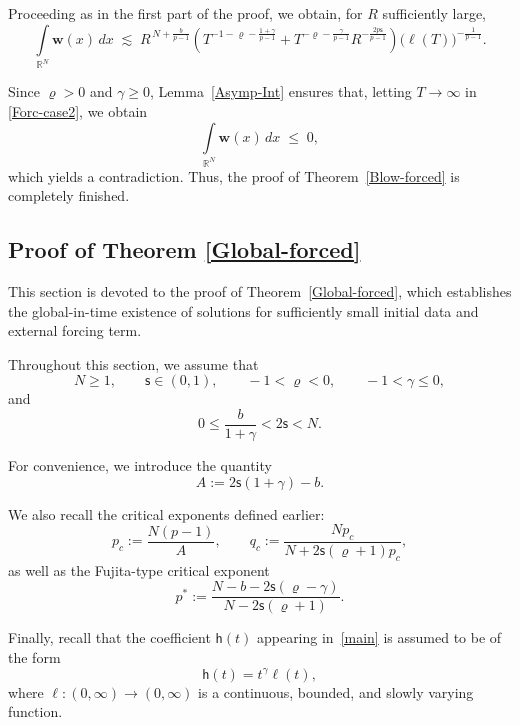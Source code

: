 \documentclass[12pt,reqno]{amsart}
\theoremstyle{plain}
\theoremstyle{definition}
\theoremstyle{remark}
\numberwithin{equation}{section}
\newcommand{\R}{\mathbb R}
\newcommand{\h}{\mathsf h}
\newcommand{\bw}{\mathbf{w}}
\newcommand{\ts}{\mathsf{s}}
\begin{document}
\begin{enumerate}[label=(\roman*)]
Proceeding as in the first part of the proof, we obtain, for $R$ sufficiently large,  
\begin{equation}
    \label{Forc-case2}
    \int\limits_{\R^N} \bw(x) \, dx
    \;\lesssim\;
    R^{\,N+\frac{b}{p-1}}
    \left(
        T^{-1-\varrho-\frac{1+\gamma}{p-1}}
        + T^{-\varrho-\frac{\gamma}{p-1}} R^{-\frac{2p\ts}{p-1}}
    \right)
    \big( \ell(T) \big)^{-\frac{1}{p-1}}.
\end{equation}

Since $\varrho > 0$ and $\gamma \geq 0$, Lemma~\ref{Asymp-Int} ensures that, letting $T \to \infty$ in \eqref{Forc-case2}, we obtain 
$$
    \int\limits_{\R^N} \bw(x) \, dx \;\leq\; 0,
$$
which yields a contradiction.  
Thus, the proof of Theorem~\ref{Blow-forced} is completely finished.
\end{enumerate}

\subsection{Proof of Theorem \ref{Global-forced}}

This section is devoted to the proof of Theorem~\ref{Global-forced}, which establishes the global-in-time existence of solutions for sufficiently small initial data and external forcing term. 



Throughout this section, we assume that
\[
N\geq 1,\qquad \ts\in(0,1),\qquad -1<\varrho<0,
\qquad -1<\gamma\leq 0,
\]
and
\[
0\leq \frac{b}{1+\gamma}<2\ts<N.
\]

For convenience, we introduce the quantity
\begin{equation}
\label{eq:A}
A:=2\ts(1+\gamma)-b.
\end{equation}

We also recall the critical exponents defined earlier:
\[
p_{c}:=\frac{N(p-1)}{A},
\qquad
q_{c}:=\frac{Np_{c}}{N+2\ts(\varrho+1)p_{c}},
\]
as well as the Fujita-type critical exponent
\[
p^{*}:=
\frac{N-b-2\ts(\varrho-\gamma)}
{N-2\ts(\varrho+1)}.
\]

Finally, recall that the coefficient $\h(t)$ appearing in~\eqref{main} is assumed to be of the form
\[
\h(t)=t^{\gamma}\ell(t),
\]
where $\ell:(0,\infty)\to(0,\infty)$ is a continuous, bounded, and slowly varying function.
\end{document}
